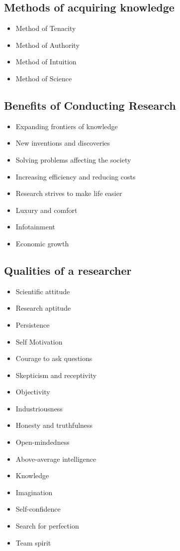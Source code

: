 \documentclass[
  letterpaper,
  DIV=11,
  numbers=noendperiod]{scrreprt}
\providecommand{\tightlist}{%
  \setlength{\itemsep}{0pt}\setlength{\parskip}{0pt}}\usepackage{longtable,booktabs,array}
\begin{document}
\subsection{Methods of acquiring
knowledge}\label{methods-of-acquiring-knowledge}

\begin{itemize}
\tightlist
\item
  Method of Tenacity
\item
  Method of Authority
\item
  Method of Intuition
\item
  Method of Science
\end{itemize}

\subsection{Benefits of Conducting
Research}\label{benefits-of-conducting-research}

\begin{itemize}
\tightlist
\item
  Expanding frontiers of knowledge
\item
  New inventions and discoveries
\item
  Solving problems affecting the society
\item
  Increasing efficiency and reducing costs
\item
  Research strives to make life easier
\item
  Luxury and comfort
\item
  Infotainment
\item
  Economic growth
\end{itemize}

\subsection{Qualities of a researcher}\label{qualities-of-a-researcher}

\begin{itemize}
\tightlist
\item
  Scientific attitude
\item
  Research aptitude
\item
  Persistence
\item
  Self Motivation
\item
  Courage to ask questions
\item
  Skepticism and receptivity
\item
  Objectivity
\item
  Industriousness
\item
  Honesty and truthfulness
\item
  Open-mindedness
\item
  Above-average intelligence
\item
  Knowledge
\item
  Imagination
\item
  Self-confidence
\item
  Search for perfection
\item
  Team spirit
\end{itemize}
\end{document}
